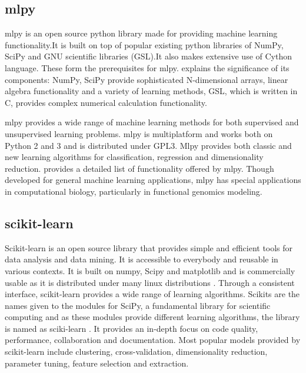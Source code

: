 \subsection{mlpy \cv}
    
    mlpy is an open source python library made for providing machine
    learning functionality.It is built on top of popular existing
    python libraries of NumPy, SciPy and GNU scientific libraries
    (GSL).It also makes extensive use of Cython language. These form
    the prerequisites for
    mlpy. \cite{DBLP:journals/corr/abs-1202-6548} explains the
    significance of its components: NumPy, SciPy provide
    sophisticated N-dimensional arrays, linear algebra functionality
    and a variety of learning methods, GSL, which is written in C,
    provides complex numerical calculation functionality.

    mlpy provides a wide range of machine learning methods for both
    supervised and unsupervised learning problems. mlpy is multiplatform
    and works both on Python 2 and 3 and is distributed under GPL3. Mlpy
    provides both classic and new learning algorithms for classification,
    regression and dimensionality reduction. \cite{www-mlpy}
    provides a detailed list of functionality offered by mlpy. Though
    developed for general machine learning applications, mlpy has special
    applications in computational biology, particularly in functional
    genomics modeling.
    
\subsection{scikit-learn}

    Scikit-learn is an open source library that provides simple and
    efficient tools for data analysis and data mining. It is
    accessible to everybody and reusable in various contexts. It is
    built on numpy, Scipy and matplotlib and is commercially usable as
    it is distributed under many linux distributions
    \cite{scik1}. Through a consistent interface, scikit-learn
    provides a wide range of learning algorithms. Scikits are the
    names given to the modules for SciPy, a fundamental library for
    scientific computing and as these modules provide different
    learning algorithms, the library is named as sciki-learn
    \cite{scik2}. It provides an in-depth focus on code quality,
    performance, collaboration and documentation. Most popular models
    provided by scikit-learn include clustering, cross-validation,
    dimensionality reduction, parameter tuning, feature selection and
    extraction.


